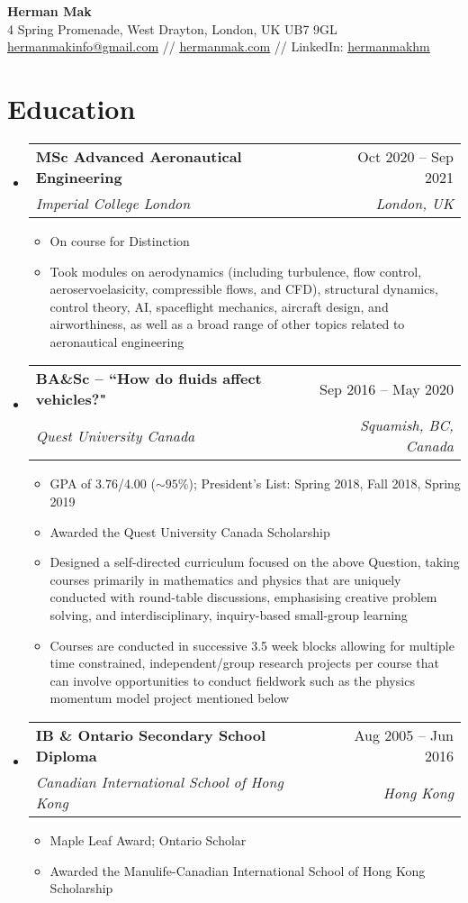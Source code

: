 \documentclass[a4paper,11pt]{article}
\makeatletter
\newcommand{\resumeItem}[1]{
  \item\small{
    {#1\vspace{-2pt}}
  }
}
\newcommand{\resumeSubheading}[4]{
  \vspace{-2pt}\item
    \begin{tabular*}{0.97\textwidth}[t]{l@{\extracolsep{\fill}}r}
      \textbf{#1} & #2 \\
      \textit{\small#3} & \textit{\small #4} \\
    \end{tabular*}\vspace{-7pt}
}
\newcommand{\resumeSubHeadingListStart}{\begin{itemize}[leftmargin=0.15in, label={}]}
\newcommand{\resumeSubHeadingListEnd}{\end{itemize}}
\newcommand{\resumeItemListStart}{\begin{itemize}}
\newcommand{\resumeItemListEnd}{\end{itemize}\vspace{-5pt}}
\makeatother
\begin{document}
\begin{center}
    \textbf{\Large Herman Mak} \\ \vspace{1pt}
    4 Spring Promenade, West Drayton, London, UK UB7 9GL\\
    \small \href{mailto:hermanmakinfo@gmail.com}{\underline{hermanmakinfo@gmail.com}} //
\href{https://hermanmak.com/}{\underline{hermanmak.com}} //
    LinkedIn: \href{https://www.linkedin.com/in/hermanmakhm/}{\underline{hermanmakhm}}
\end{center}

\section{Education}
  \resumeSubHeadingListStart
    \resumeSubheading
      {MSc Advanced Aeronautical Engineering}{Oct 2020 -- Sep 2021}
      {Imperial College London}{London, UK}
        \resumeItemListStart
        \resumeItem{On course for Distinction}
        \resumeItem{Took modules on aerodynamics (including turbulence, flow control, aeroservoelasicity, compressible flows, and CFD), structural dynamics, control theory, AI, spaceflight mechanics, aircraft design, and airworthiness, as well as a broad range of other topics related to aeronautical engineering} 
      \resumeItemListEnd
    \resumeSubheading
      {BA\&Sc -- ``How do fluids affect vehicles?"}{Sep 2016 -- May 2020}
      {Quest University Canada}{Squamish, BC, Canada}
      \resumeItemListStart
      	\resumeItem{GPA of 3.76/4.00 ($\sim95$\%); President's List: Spring 2018, Fall 2018, Spring 2019}
      	\resumeItem{Awarded the Quest University Canada Scholarship}
        \resumeItem{Designed a self-directed curriculum focused on the above Question, taking courses primarily in mathematics and physics that are uniquely conducted with round-table discussions, emphasising creative problem solving, and interdisciplinary, inquiry-based small-group learning}
        \resumeItem{Courses are conducted in successive 3.5 week blocks allowing for multiple time constrained, independent/group research projects per course that can involve opportunities to conduct fieldwork such as the physics momentum model project mentioned below}
      \resumeItemListEnd
    \resumeSubheading
      {IB \& Ontario Secondary School Diploma}{Aug 2005 -- Jun 2016}
      {Canadian International School of Hong Kong}{Hong Kong}
      \resumeItemListStart
        \resumeItem{Maple Leaf Award; Ontario Scholar}
        \resumeItem{Awarded the Manulife-Canadian International School of Hong Kong Scholarship}
      \resumeItemListEnd
  \resumeSubHeadingListEnd
\end{document}
